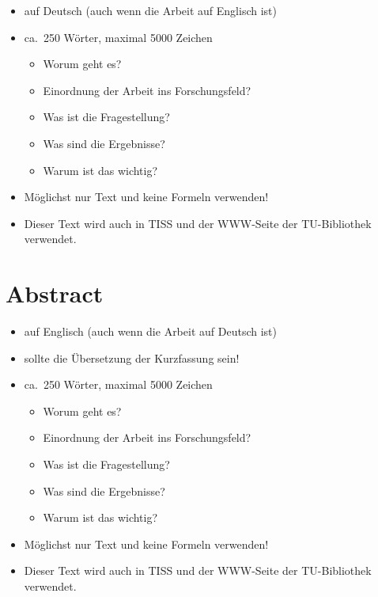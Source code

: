 \begin{itemize}
  \item auf Deutsch (auch wenn die Arbeit auf Englisch ist)
  \item ca.\ 250 Wörter, maximal 5000 Zeichen
        \begin{itemize}
          \item Worum geht es?
          \item Einordnung der Arbeit ins Forschungsfeld?
          \item Was ist die Fragestellung?
          \item Was sind die Ergebnisse?
          \item Warum ist das wichtig?
        \end{itemize}
  \item Möglichst nur Text und keine Formeln verwenden!
  \item Dieser Text wird auch in TISS und der WWW-Seite der TU-Bibliothek verwendet.
\end{itemize}

\cleardoublepage


\chapter*{Abstract}
\thispagestyle{empty}

{

  \begin{itemize}
    \item auf Englisch (auch wenn die Arbeit auf Deutsch ist)
    \item sollte die Übersetzung der Kurzfassung sein!
    \item ca.\ 250 Wörter, maximal 5000 Zeichen
          \begin{itemize}
            \item Worum geht es?
            \item Einordnung der Arbeit ins Forschungsfeld?
            \item Was ist die Fragestellung?
            \item Was sind die Ergebnisse?
            \item Warum ist das wichtig?
          \end{itemize}
    \item Möglichst nur Text und keine Formeln verwenden!
    \item Dieser Text wird auch in TISS und der WWW-Seite der TU-Bibliothek verwendet.
  \end{itemize}

}

